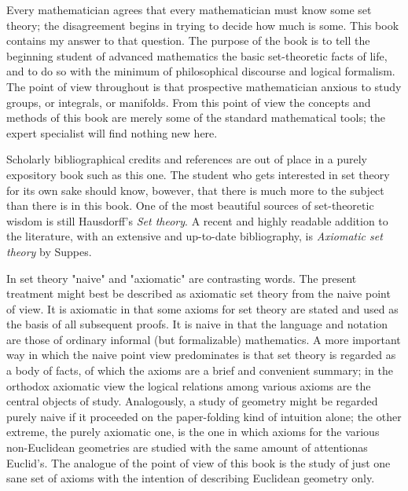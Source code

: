 

Every mathematician agrees that every mathematician must know some set theory; the disagreement begins in trying to decide how much is some. This book contains my answer to that question. The purpose of the book is to tell the beginning student of advanced mathematics the basic set-theoretic facts of life, and to do so with the minimum of philosophical discourse and logical  formalism. The point of view throughout is that prospective mathematician anxious to study groups, or integrals, or manifolds. From this point of view the concepts and methods of this book are merely some of the standard mathematical tools; the expert specialist will find nothing new here.

Scholarly bibliographical credits and references are out of place in a purely expository book such as this one. The student who gets interested in set theory for its own sake should know, bowever, that there is much more to the subject than there is in this book. One of the most beautiful sources of set-theoretic wisdom is still Hausdorff's \textit{Set theory}. A recent and highly readable addition to the literature, with an extensive and up-to-date bibliography, is \textit{Axiomatic set theory} by Suppes. 

In set theory "naive" and "axiomatic" are contrasting words. The present treatment might best be described as axiomatic set theory from the naive point of view. It is axiomatic in that some axioms for set theory are stated and used as the basis of all subsequent proofs. It is naive in that the language and notation are those of ordinary informal (but formalizable) mathematics. A more important way in which the naive point view predominates is that set theory is regarded as a body of facts, of which the axioms are a brief and convenient summary; in the orthodox axiomatic view the logical relations among various axioms are the central objects of study. Analogously, a study of geometry might be regarded purely naive if it proceeded on the paper-folding kind of intuition alone; the other extreme, the purely axiomatic one, is the one in which axioms for the various non-Euclidean geometries are studied with the same amount of attentionas Euclid's. The analogue of the point of view of this book is the study of just one sane set of axioms with the intention of describing Euclidean geometry only.

